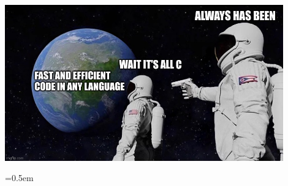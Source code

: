 \documentclass[11pt,a4paper]{article}
\begin{document}
\begin{center}
    \includegraphics[width=0.9\textwidth]{diagramme/meme.jpg}
\end{center}


\clearpage

\emergencystretch=0.5em

\printbibliography[title={Literaturverzeichnis}]
\end{document}
